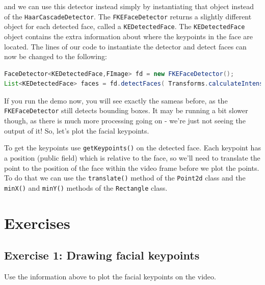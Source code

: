 and we can use this detector instead simply by instantiating that object instead of the 
\verb+HaarCascadeDetector+. The \verb+FKEFaceDetector+ returns a slightly different object 
for each detected face, called a \verb+KEDetectedFace+. The \verb+KEDetectedFace+ object 
contains the extra information about where the keypoints in the face are located. 
The lines of our code to instantiate the detector and detect faces can now be changed to 
the following:
\begin{lstlisting}[language=java]
FaceDetector<KEDetectedFace,FImage> fd = new FKEFaceDetector();
List<KEDetectedFace> faces = fd.detectFaces( Transforms.calculateIntensity( frame ) );
\end{lstlisting}
If you run the demo now, you will see exactly the sameas before, as the \verb+FKEFaceDetector+ 
still detects bounding boxes. It may be running a bit slower though, as there is much more 
processing going on - we're just not seeing the output of it! So, let's plot the facial keypoints.

To get the keypoints use \verb+getKeypoints()+ on the detected face. Each keypoint has a 
position (public field) which is relative to the face, so we'll need to translate the 
point to the position of the face within the video frame before we plot the points. 
To do that we can use the \verb+translate()+ method of the \verb+Point2d+ class
and the \verb+minX()+ and \verb+minY()+ methods of the \verb+Rectangle+ class.

\section*{Exercises}
\subsection*{Exercise 1: Drawing facial keypoints}
Use the information above to plot the facial keypoints on the video.

